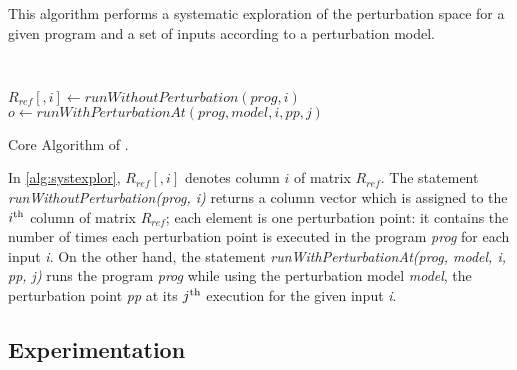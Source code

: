 This algorithm performs a systematic exploration of the perturbation space for a given program and a set of inputs according to a perturbation model.

\begin{algorithm}[h]
	\\
	\begin{algorithmic}
				\State $R_{ref}[,i] \leftarrow runWithoutPerturbation(prog, i)$
					\State $o \leftarrow runWithPerturbationAt(prog,model,i,pp,j)$
					\Else 
					\EndIf
				\EndFor
			\EndFor
		\EndFor
	\end{algorithmic}
	\caption{Core Algorithm of \perturb.}
	\label{alg:systexplor}
\end{algorithm}

In \autoref{alg:systexplor}, $R_{ref}[,i]$ denotes column $i$ of matrix $R_{ref}$. 
The statement \emph{runWithoutPerturbation(prog, i)} returns a column vector which is assigned to the $i^{\mbox{\scriptsize th}}$ column of matrix $R_{ref}$; each element is one perturbation point: it contains the number of times each perturbation point is executed in the program \emph{prog} for each input \emph{i}. 
On the other hand, the statement \emph{runWithPerturbationAt(prog, model, i, pp, j)} runs the program \emph{prog} while using the perturbation model \emph{model}, the perturbation point \emph{pp} at its $j^{\mbox{\scriptsize th}}$ execution for the given input \emph{i}.

\subsection{Experimentation}
\label{subsec:transversal-contributions:correctness:experimentation}

